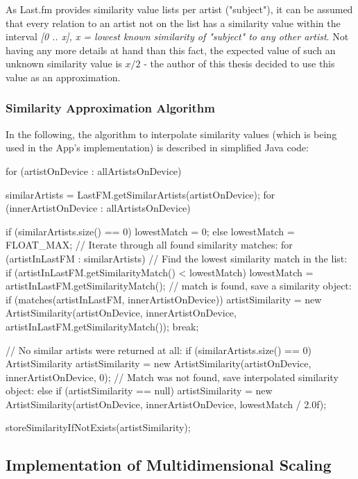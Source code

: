 As Last.fm provides similarity value lists per artist ("subject"), it can be assumed that every relation to an artist not on the list has a similarity value within the interval \emph{[0 .. x], x = lowest known similarity of "subject" to any other artist}. Not having any more details at hand than this fact, the expected value of such an unknown similarity value is $x / 2$ - the author of this thesis decided to use this value as an approximation.

\subsubsection{Similarity Approximation Algorithm}

In the following, the algorithm to interpolate similarity values (which is being used in the App's implementation) is described in simplified Java code:

\begin{code}
for (artistOnDevice : allArtistsOnDevice) {
  similarArtists = LastFM.getSimilarArtists(artistOnDevice);
  for (innerArtistOnDevice : allArtistsOnDevice) {
    if (similarArtists.size() == 0)
      lowestMatch = 0;
    else
      lowestMatch = FLOAT_MAX;
    // Iterate through all found similarity matches:
    for (artistInLastFM : similarArtists) {
      // Find the lowest similarity match in the list:
      if (artistInLastFM.getSimilarityMatch() < lowestMatch)
        lowestMatch = artistInLastFM.getSimilarityMatch();
        // match is found, save a similarity object:
      if (matches(artistInLastFM, innerArtistOnDevice)) {
        artistSimilarity = new ArtistSimilarity(artistOnDevice, 
          innerArtistOnDevice, artistInLastFM.getSimilarityMatch());
        break;
      }
    }
	
    // No similar artists were returned at all:
    if (similarArtists.size() == 0)
      ArtistSimilarity artistSimilarity = new ArtistSimilarity(artistOnDevice, 
        innerArtistOnDevice, 0);    
    // Match was not found, save interpolated similarity object:
    else if (artistSimilarity == null)
      artistSimilarity = new ArtistSimilarity(artistOnDevice, 
      innerArtistOnDevice, lowestMatch / 2.0f);

    storeSimilarityIfNotExists(artistSimilarity);
  }
}	            
	
\end{code}

\subsection{Implementation of Multidimensional Scaling}
\label{subsec:implementation-mds}


